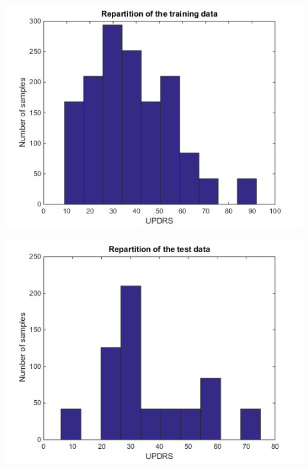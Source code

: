\documentclass{report}
\begin{document}
		\begin{center}
			\begin{minipage}{.40\linewidth}
				\includegraphics[scale=0.42]{ressources/db1}
			\end{minipage}
			\hspace*{1.5cm}
			\begin{minipage}{.40\linewidth}
				\includegraphics[scale=0.42]{ressources/db2}
			\end{minipage}
			\hspace*{0.6cm}
		\end{center}
		\vspace{1cm}
\end{document}
